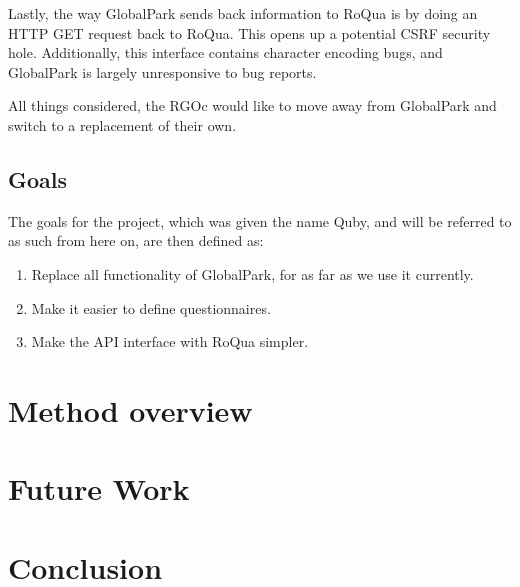 \documentclass[10pt,fleqn,a4paper]{article}
\begin{document}
\begin{twocolumn}
Lastly, the way GlobalPark sends back information to RoQua is by doing
an HTTP GET request back to RoQua. This opens up a potential CSRF
security hole. Additionally, this interface contains character
encoding bugs, and GlobalPark is largely unresponsive to bug reports.

All things considered, the RGOc would like to move away from
GlobalPark and switch to a replacement of their own.

\subsection{Goals}

The goals for the project, which was given the name Quby, and will be
referred to as such from here on, are then defined as:

\begin{enumerate}
\item Replace all functionality of GlobalPark, for as far as we use it
  currently.
\item \label{dsl} Make it easier to define questionnaires.
\item \label{restful} Make the API interface with RoQua simpler.
\end{enumerate}

\section{Method overview}



\section{Future Work}

\section{Conclusion}

%
%
\end{twocolumn}
\end{document}
